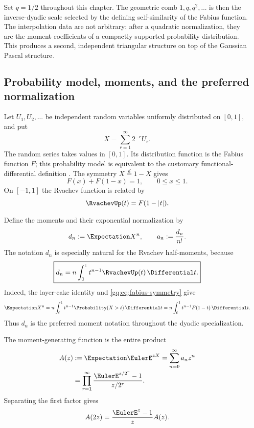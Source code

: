 Set $q=1/2$ throughout this chapter.  The geometric comb
$1,q,q^2,\ldots$ is then the inverse-dyadic scale selected by the defining
self-similarity of the Fabius function.  The interpolation data are not
arbitrary: after a quadratic normalization, they are the moment coefficients
of a compactly supported probability distribution.  This produces a second,
independent triangular structure on top of the Gaussian Pascal structure.

\subsection{Probability model, moments, and the preferred normalization}

Let $U_1,U_2,\ldots$ be independent random variables uniformly distributed
on $[0,1]$, and put
\begin{equation}
 X=\sum_{r=1}^{\infty}2^{-r}U_r.
 \label{gq:eq:fabius-random-series}
\end{equation}
The random series takes values in $[0,1]$.  Its distribution function is the
Fabius function $F$; this probability model is equivalent to the customary
functional-differential definition \cite{Fabius1966,Arias2017Definition}.
The symmetry $X\overset d=1-X$ gives
\begin{equation}
 F(x)+F(1-x)=1,
 \qquad 0\le x\le1.
 \label{gq:eq:fabius-symmetry}
\end{equation}
On $[-1,1]$ the Rvachev function is related by
\begin{equation}
 \RvachevUp(t)=F(1-|t|).
 \label{gq:eq:up-fabius-relation}
\end{equation}

Define the moments and their exponential normalization by
\begin{equation}
 d_n:=\Expectation X^n,
 \qquad
 a_n:=\frac{d_n}{n!}.
 \label{gq:eq:fabius-moment-normalization}
\end{equation}
The notation $d_n$ is especially natural for the Rvachev half-moments,
because
\begin{equation}
 \boxed{
 d_n=n\int_0^1t^{n-1}\RvachevUp(t)\,\Differential t.}
 \label{gq:eq:preferred-half-moment}
\end{equation}
Indeed, the layer-cake identity and \eqref{gq:eq:fabius-symmetry} give
\[
 \Expectation X^n=n\int_0^1t^{n-1}\Probability(X>t)\,\Differential t
       =n\int_0^1t^{n-1}F(1-t)\,\Differential t.
\]
Thus $d_n$ is the preferred moment notation throughout the dyadic
specialization.

The moment-generating function is the entire product
\begin{align}
 A(z)&:=\Expectation\EulerE^{zX}=\sum_{n=0}^{\infty}a_nz^n
 \label{gq:eq:fabius-mgf-series}\\
 &=\prod_{r=1}^{\infty}
   \frac{\EulerE^{z/2^r}-1}{z/2^r}.
 \label{gq:eq:fabius-mgf-product}
\end{align}
Separating the first factor gives
\begin{equation}
 A(2z)=\frac{\EulerE^z-1}{z}A(z).
 \label{gq:eq:fabius-mgf-functional}
\end{equation}

